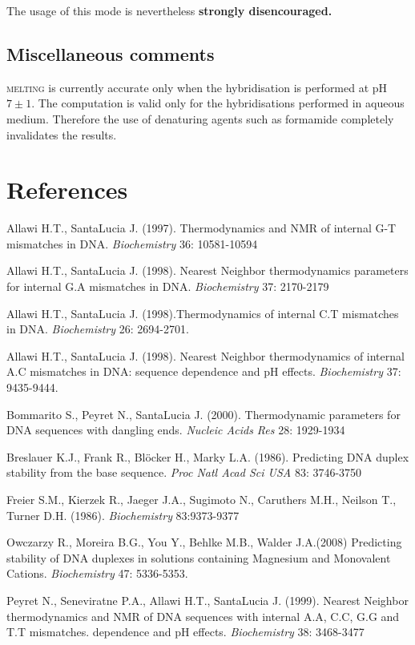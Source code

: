 \documentclass{article}
\begin{document}
  The usage of this mode is nevertheless  \textbf{strongly disencouraged.}   
   
\subsection{Miscellaneous comments }  
\textsc{melting} is currently accurate only when the hybridisation is performed
at pH $7\pm 1$.  The computation is valid only for the hybridisations performed
in aqueous medium. Therefore the use of denaturing agents such as formamide
completely invalidates the results.
   
\section{References }
Allawi 
H.T., SantaLucia J. (1997). Thermodynamics and NMR of internal G-T mismatches 
in DNA. \textit{Biochemistry}  36: 10581-10594   

Allawi H.T., SantaLucia J. (1998). Nearest Neighbor thermodynamics parameters 
for internal G.A mismatches in DNA. \textit{Biochemistry} 37: 2170-2179

Allawi H.T., SantaLucia J. (1998).Thermodynamics of internal C.T mismatches in DNA.
\textit{Biochemistry} 26: 2694-2701.

Allawi H.T., SantaLucia J. (1998). Nearest Neighbor thermodynamics of internal 
A.C mismatches in DNA: sequence dependence and pH effects.
\textit{Biochemistry} 37: 9435-9444.

Bommarito S., Peyret N., SantaLucia J. (2000).  Thermodynamic parameters for DNA
sequences with dangling ends.  \textit{Nucleic Acids Res} 28: 1929-1934

  Breslauer K.J., Frank R., Bl\"ocker 
H., Marky L.A. (1986). Predicting DNA duplex stability from the base sequence. 
 \textit{Proc Natl Acad Sci USA}  83: 3746-3750   

  Freier S.M., Kierzek R., Jaeger 
J.A., Sugimoto N., Caruthers M.H., Neilson T., Turner D.H. (1986). \textit{Biochemistry} 
 83:9373-9377 
 
 Owczarzy R., Moreira B.G., You Y., Behlke M.B., Walder J.A.(2008) Predicting stability of DNA duplexes 
 in solutions containing Magnesium and Monovalent Cations. \textit{Biochemistry} 47: 5336-5353.  

Peyret N., Seneviratne P.A., Allawi H.T., SantaLucia J. (1999). Nearest Neighbor thermodynamics and 
NMR of DNA sequences with internal A.A, C.C, G.G and T.T mismatches. dependence and pH effects.
\textit{Biochemistry} 38: 3468-3477
\end{document}
